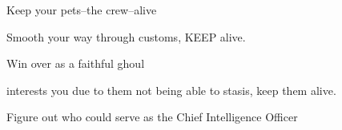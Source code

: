 \documentclass[char]{guildcamp4}
\begin{document}
 

\begin{itemz}[Goals]
	\item Keep your pets--the crew--alive
	\item Smooth your way through customs, KEEP \cCbad{} alive.
	\item Win over \cSpite{} as a faithful ghoul
	\item \cPlead{} interests you due to them not being able to stasis, keep them alive. 
	\item Figure out who could serve as the Chief Intelligence Officer

\end{itemz}

\begin{contacts}
	\contact{\cVtwo{}} 
	\contact{\cVthree{}}
	\contact{\cJoan{}}
	\contact{\cJulie{}}
	\contact{\cJames{}}
	\contact{\cRasputin{}}
	\contact{\cSpite{}}
	\contact{\cPlead{}}
\end{contacts}
\end{document}
